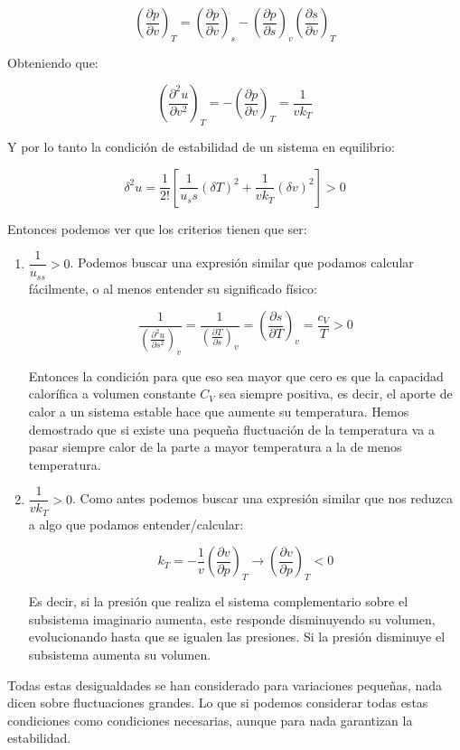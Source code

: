 \documentclass[12pt,a4paper]{article}
\newcommand{\parentesis}[1]{\left( #1 \right)}
\newcommand{\parcialesnormales}[2]{\parentesis{\parciales{ #1}{#2 }}}
\newcommand{\parcialesdobles}[2]{\parentesis{\parciales{^2 #1}{#2 ^2}}}
\newcommand{\parciales}[2]{\frac{\partial #1}{\partial #2}}
\begin{document}
$$ \parcialesnormales{p}{v}_T  = \parcialesnormales{p}{v}_s - \parcialesnormales{p}{s}_v \parcialesnormales{s}{v}_T $$

Obteniendo que:

\begin{equation}
\parcialesdobles{u}{v}_T = - \parcialesnormales{p}{v}_T = \dfrac{1}{v k_T}
\end{equation}

Y por lo tanto la condición de estabilidad de un sistema en equilibrio:

\begin{equation}
\delta^2 u = \dfrac{1}{2!} \left[  \dfrac{1}{u_ss} (\delta T)^2 + \dfrac{1}{v k_T} (\delta v)^2  \right] > 0
\end{equation}


Entonces podemos ver que los criterios tienen que ser:

\begin{enumerate}
\item $\dfrac{1}{u_{ss}} > 0$. Podemos buscar una expresión similar que podamos calcular fácilmente, o al menos entender su significado físico:

$$ \dfrac{1}{\parcialesdobles{u}{s}_v} = \dfrac{1}{\parcialesnormales{T}{s}_v} =  \parcialesnormales{s}{T}_v = \dfrac{c_V}{T} > 0  $$


Entonces la condición para que eso sea mayor que cero es que la capacidad calorífica a volumen constante $C_V$ sea siempre positiva, es decir, el aporte de calor a un sistema estable hace que aumente su temperatura. Hemos demostrado que si existe una pequeña fluctuación de la temperatura va a pasar siempre calor de la parte a mayor temperatura a la de menos temperatura. 



\item $\dfrac{1}{v k_T} > 0$. Como antes podemos buscar una expresión similar que nos reduzca a algo que podamos entender/calcular:

$$ k_T = - \dfrac{1}{v} \parcialesnormales{v}{p}_T \longrightarrow \parcialesnormales{v}{p}_T < 0 $$

Es decir, si la presión que realiza el sistema complementario sobre el subsistema imaginario aumenta, este responde disminuyendo su volumen, evolucionando hasta que se igualen las presiones. Si la presión disminuye el subsistema aumenta su volumen. \\
\end{enumerate}

Todas estas desigualdades se han considerado para variaciones pequeñas, nada dicen sobre fluctuaciones grandes. Lo que si podemos considerar todas estas condiciones como condiciones necesarias, aunque para nada garantizan la estabilidad. \\
\end{document}
